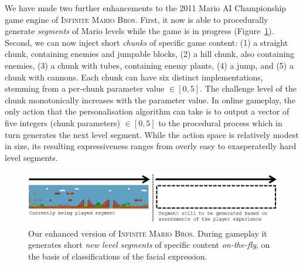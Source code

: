 \documentclass[letterpaper]{article}
\begin{document}
We have made two further enhancements to the 2011 Mario AI Championship game engine of \textsc{Infinite Mario Bros.} First, it now is able to procedurally generate \emph{segments} of Mario levels while the game is in progress (Figure~\ref{fig:mario}). Second, we can now inject short \emph{chunks} of specific game content: (1) a straight chunk, containing enemies and jumpable blocks, (2) a hill chunk, also containing enemies, (3) a chunk with tubes, containing enemy plants, (4) a jump, and (5) a chunk with cannons. Each chunk can have six distinct implementations, stemming from a per-chunk parameter value $\in [0,5]$. The challenge level of the chunk monotonically increases with the parameter value. In online gameplay, the only action that the personalisation algorithm can take is to output a vector of five integers (chunk parameters) $\in [0,5]$ to the procedural process which in turn generates the next level segment. While the action space is relatively modest in size, its resulting expressiveness ranges from overly easy to exasperatedly hard level segments.


\begin{figure}[t]
  \begin{center}
  \includegraphics[width=1.00\columnwidth]{images/mario-new-new-new-new.png}
  \caption{Our enhanced version of \textsc{Infinite Mario Bros.} During gameplay it generates short \emph{new level segments} of specific content \emph{on-the-fly}, on the basis of classifications of the facial expression.}
  \label{fig:mario}
  \end{center}
\end{figure}
\end{document}
